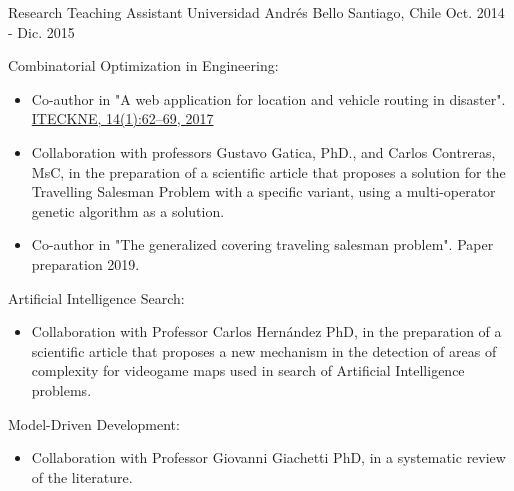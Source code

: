 
\begin{cventries}

  \cventry
    {Research Teaching Assistant} %
    {Universidad Andrés Bello} %
    {Santiago, Chile} %
    {Oct. 2014 - Dic. 2015} %
    {
      \begin{cvitems} %
      	\item {Combinatorial Optimization in Engineering:}
      		\begin{itemize}
      			\item {Co-author in "A web application for location and vehicle routing in disaster". \href{http://revistas.ustabuca.edu.co/index.php/ITECKNE/article/view/1631}{ITECKNE, 14(1):62–69, 2017}}
      			\item {Collaboration with professors Gustavo Gatica, PhD., and Carlos Contreras, MsC, in the preparation of a scientific article that proposes a solution for the Travelling Salesman Problem with a specific variant, using a multi-operator genetic algorithm as a solution.}
      			\item {Co-author in "The generalized covering traveling salesman problem". Paper preparation 2019.}
      		\end{itemize}
      	\item {Artificial Intelligence Search:}
      	\begin{itemize}
      		\item {Collaboration with Professor Carlos Hernández PhD, in the preparation of a scientific article that proposes a new mechanism in the detection of areas of complexity for videogame maps used in search of Artificial Intelligence problems.}
      	\end{itemize}
      	\item {Model-Driven Development:}
      	\begin{itemize}
      		\item {Collaboration with Professor Giovanni Giachetti PhD, in a systematic review of the literature.}
      	\end{itemize}
      \end{cvitems}
    }
\end{cventries}